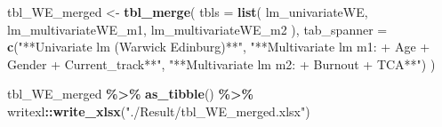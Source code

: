 \documentclass[
]{article}
\newenvironment{Shaded}{\begin{snugshade}}{\end{snugshade}}
\newcommand{\AttributeTok}[1]{\textcolor[rgb]{0.13,0.29,0.53}{#1}}
\newcommand{\FunctionTok}[1]{\textcolor[rgb]{0.13,0.29,0.53}{\textbf{#1}}}
\newcommand{\NormalTok}[1]{#1}
\newcommand{\OtherTok}[1]{\textcolor[rgb]{0.56,0.35,0.01}{#1}}
\newcommand{\SpecialCharTok}[1]{\textcolor[rgb]{0.81,0.36,0.00}{\textbf{#1}}}
\newcommand{\StringTok}[1]{\textcolor[rgb]{0.31,0.60,0.02}{#1}}
\begin{document}
\begin{Shaded}
\begin{Highlighting}[]
\NormalTok{tbl\_WE\_merged }\OtherTok{\textless{}{-}}
  \FunctionTok{tbl\_merge}\NormalTok{(}
  \AttributeTok{tbls =} \FunctionTok{list}\NormalTok{(}
\NormalTok{    lm\_univariateWE,}
\NormalTok{    lm\_multivariateWE\_m1,}
\NormalTok{    lm\_multivariateWE\_m2}
\NormalTok{  ),}
  \AttributeTok{tab\_spanner =} \FunctionTok{c}\NormalTok{(}\StringTok{"**Univariate lm (Warwick Edinburg)**"}\NormalTok{,}
                  \StringTok{"**Multivariate lm m1: + Age + Gender + Current\_track**"}\NormalTok{,}
                  \StringTok{"**Multivariate lm m2: + Burnout + TCA**"}\NormalTok{)}
\NormalTok{)}

\NormalTok{tbl\_WE\_merged }\SpecialCharTok{\%\textgreater{}\%}
  \FunctionTok{as\_tibble}\NormalTok{() }\SpecialCharTok{\%\textgreater{}\%}
\NormalTok{  writexl}\SpecialCharTok{::}\FunctionTok{write\_xlsx}\NormalTok{(}\StringTok{"./Result/tbl\_WE\_merged.xlsx"}\NormalTok{)}
\end{Highlighting}
\end{Shaded}
\end{document}
